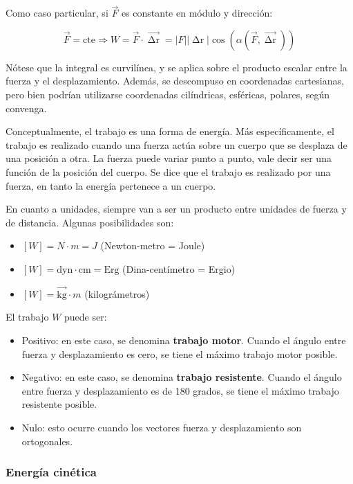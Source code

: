\documentclass{article}
\begin{document}
Como caso particular, si $\overrightarrow{F}$ es constante en módulo y dirección:

\begin{equation}
\overrightarrow{F} = \text{cte} \Rightarrow W = \overrightarrow{F} \cdot \overrightarrow{\mathop{\Delta r}} = |F| |\mathop{\Delta r}| \cos( \alpha(\overrightarrow{F}, \overrightarrow{\mathop{\Delta r}}) )
\end{equation}

Nótese que la integral es curvilínea, y se aplica sobre el producto escalar entre la fuerza y el desplazamiento. Además, se descompuso en coordenadas cartesianas, pero bien podrían utilizarse coordenadas cilíndricas, esféricas, polares, según convenga.

Conceptualmente, el trabajo es una forma de energía. Más específicamente, el trabajo es realizado cuando una fuerza actúa sobre un cuerpo que se desplaza de una posición a otra. La fuerza puede variar punto a punto, vale decir ser una función de la posición del cuerpo. Se dice que el trabajo es realizado por una fuerza, en tanto la energía pertenece a un cuerpo.

En cuanto a unidades, siempre van a ser un producto entre unidades de fuerza y de distancia. Algunas posibilidades son:

\begin{itemize}
\item $[W] = N \cdot m = J$ (Newton-metro = Joule)
\item $[W] = \text{dyn} \cdot \text{cm} = \text{Erg}$ (Dina-centímetro = Ergio)
\item $[W] = \overrightarrow{\text{kg}} \cdot m$ (kilográmetros)
\end{itemize}

El trabajo $W$ puede ser:

\begin{itemize}
\item Positivo: en este caso, se denomina \textbf{trabajo motor}. Cuando el ángulo entre fuerza y desplazamiento es cero, se tiene el máximo trabajo motor posible.
\item Negativo: en este caso, se denomina \textbf{trabajo resistente}. Cuando el ángulo entre fuerza y desplazamiento es de 180 grados, se tiene el máximo trabajo resistente posible.
\item Nulo: esto ocurre cuando los vectores fuerza y desplazamiento son ortogonales.
\end{itemize}

\subsubsection{Energía cinética}
\end{document}

